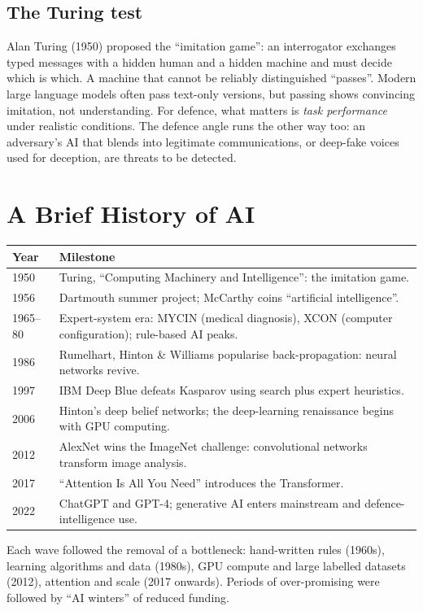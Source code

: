 \documentclass[11pt]{article}
\begin{document}
\subsection{The Turing test}
Alan Turing (1950) proposed the ``imitation game'': an interrogator exchanges typed messages with a hidden human and a hidden machine and must decide which is which. A machine that cannot be reliably distinguished ``passes''. Modern large language models often pass text-only versions, but passing shows convincing imitation, not understanding. For defence, what matters is \emph{task performance} under realistic conditions. The defence angle runs the other way too: an adversary's AI that blends into legitimate communications, or deep-fake voices used for deception, are threats to be detected.

\section{A Brief History of AI}
\begin{center}\small\renewcommand{\arraystretch}{1.25}
\begin{tabularx}{\textwidth}{lX}\toprule Year & Milestone\\\midrule
1950 & Turing, ``Computing Machinery and Intelligence'': the imitation game.\\
1956 & Dartmouth summer project; McCarthy coins ``artificial intelligence''.\\
1965--80 & Expert-system era: MYCIN (medical diagnosis), XCON (computer configuration); rule-based AI peaks.\\
1986 & Rumelhart, Hinton \& Williams popularise back-propagation: neural networks revive.\\
1997 & IBM Deep Blue defeats Kasparov using search plus expert heuristics.\\
2006 & Hinton's deep belief networks; the deep-learning renaissance begins with GPU computing.\\
2012 & AlexNet wins the ImageNet challenge: convolutional networks transform image analysis.\\
2017 & ``Attention Is All You Need'' introduces the Transformer.\\
2022 & ChatGPT and GPT-4; generative AI enters mainstream and defence-intelligence use.\\\bottomrule
\end{tabularx}\end{center}
Each wave followed the removal of a bottleneck: hand-written rules (1960s), learning algorithms and data (1980s), GPU compute and large labelled datasets (2012), attention and scale (2017 onwards). Periods of over-promising were followed by ``AI winters'' of reduced funding.
\end{document}
